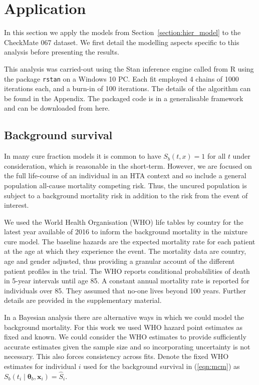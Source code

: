\documentclass[AMA,STIX1COL]{WileyNJD-v2}
\begin{document}
%
\section{Application}\label{sec:application}
In this section we apply the models from Section~\ref{section:hier_model} to the CheckMate 067 dataset.
We first detail the modelling aspects specific to this analysis before presenting the results.

This analysis was carried-out using the Stan inference engine \cite{carpenter2017stan} called from R \cite{Rcoreteam} using the package \texttt{rstan} on a Windows 10 PC.
Each fit employed 4 chains of 1000 iterations each, and a burn-in of 100 iterations.
The details of the algorithm can be found in the Appendix.
The packaged code is in a generalisable framework and can be downloaded from here.

%
\subsection{Background survival}
In many cure fraction models it is common to have $S_b(t, x) = 1$ for all $t$ under consideration, which is reasonable in the short-term.
However, we are focused on the full life-course of an individual in an HTA context and so include a general population all-cause mortality competing risk.
Thus, the uncured population is subject to a background mortality risk in addition to the risk from the event of interest.

We used the World Health Organisation (WHO) life tables by country for the latest year available of 2016 \cite{wholifetables} to inform the background mortality in the mixture cure model.
The baseline hazards are the expected mortality rate for each patient at the age at which they experience the event.
The mortality data are country, age and gender adjusted, thus providing a granular account of the different patient profiles in the trial.
The WHO reports conditional probabilities of death in 5-year intervals until age 85.
A constant annual mortality rate is reported for individuals over 85. They assumed that no-one lives beyond 100 years.
Further details are provided in the supplementary material.

In a Bayesian analysis there are alternative ways in which we could model the background mortality.
For this work we used WHO hazard point estimates as fixed and known.
We could consider the WHO estimates to provide sufficiently accurate estimates given the sample size and so incorporating uncertainty is not necessary. This also forces consistency across fits.
Denote the fixed WHO estimates for individual $i$ used for the background survival in (\ref{eqn:mcm}) as
$S_b(t_i \mid \bm\theta_b, \bm{x}_i) = \hat{S}_i$.
\end{document}
